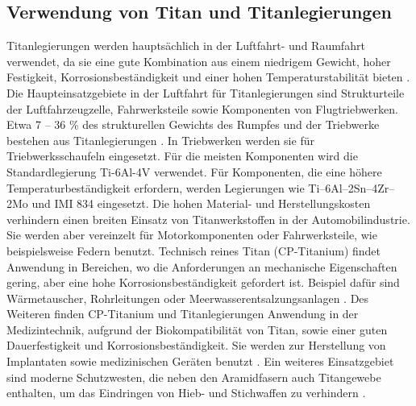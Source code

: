\pagebreak

\subsection{Verwendung von Titan und Titanlegierungen}
Titanlegierungen werden hauptsächlich in der Luftfahrt- und Raumfahrt verwendet, da sie eine gute Kombination aus einem niedrigem Gewicht, hoher Festigkeit, Korrosionsbeständigkeit und einer hohen Temperaturstabilität bieten \cite{C.Leyens.2005,R.R.Boyer.1996,M.PetersJ.KumpfertC.WardC.Leyens.2003}. Die Haupteinsatzgebiete in der Luftfahrt für Titanlegierungen sind Strukturteile der Luftfahrzeugzelle, Fahrwerksteile sowie Komponenten von Flugtriebwerken. Etwa 7 -- 36 \% des strukturellen Gewichts des Rumpfes und der Triebwerke bestehen aus Titanlegierungen \cite{Lutjering.2007}. In Triebwerken werden sie für Triebwerksschaufeln eingesetzt. Für die meisten Komponenten wird die Standardlegierung Ti-6Al-4V verwendet. Für Komponenten, die eine höhere Temperaturbeständigkeit erfordern, werden Legierungen wie Ti–6Al–2Sn–4Zr–2Mo und IMI 834 eingesetzt. Die hohen Material- und Herstellungskosten verhindern einen breiten Einsatz von Titanwerkstoffen in der Automobilindustrie. Sie werden aber vereinzelt für Motorkomponenten oder Fahrwerksteile, wie beispielsweise Federn benutzt. Technisch reines Titan (CP-Titanium) findet Anwendung in Bereichen, wo die Anforderungen an mechanische Eigenschaften gering, aber eine hohe Korrosionsbeständigkeit gefordert ist. Beispiel dafür sind Wärmetauscher, Rohrleitungen oder Meerwasserentsalzungsanlagen \cite{A.D.KhawajiaI.K.KutubkhanahaJ.M.Wieb.2008}. Des Weiteren finden CP-Titanium und Titanlegierungen Anwendung in der Medizintechnik, aufgrund der Biokompatibilität von Titan, sowie einer guten Dauerfestigkeit und Korrosionsbeständigkeit. Sie werden zur Herstellung von Implantaten sowie medizinischen Geräten benutzt \cite{M.GeethaA.K.SinghR.AsokamaniA.K.Gogia.2009}. Ein weiteres Einsatzgebiet sind moderne Schutzwesten, die neben den Aramidfasern auch Titangewebe enthalten, um das Eindringen von Hieb- und Stichwaffen zu verhindern \cite{C.Leyens.2005}.  
